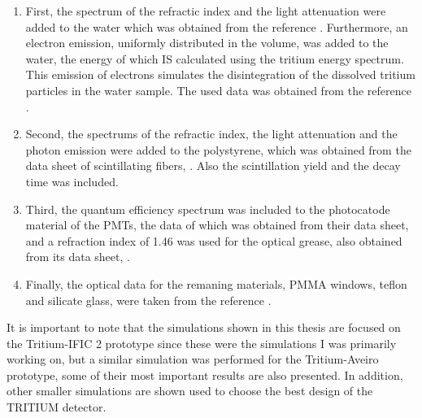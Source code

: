 \begin{enumerate}

\item{} First, the spectrum of the refractic index and the light attenuation were added to the water which was obtained from the reference \cite{WaterPropertiesSimulation}. Furthermore, an electron emission, uniformly distributed in the volume, was added to the water, the energy of which IS calculated using the tritium energy spectrum. This emission of electrons simulates the disintegration of the dissolved tritium particles in the water sample. The used data was obtained from the reference \cite{TritiumEmissionSpectrum}.

\item{} Second, the spectrums of the refractic index, the light attenuation and the photon emission were added to the polystyrene, which was obtained from the data sheet of scintillating fibers, \cite{DataSheetBCF12Fiber}.  Also the scintillation yield and the decay time was included. 

\item{} Third, the quantum efficiency spectrum was included to the photocatode material of the PMTs, the data of which was obtained from their data sheet, \cite{DataSheetPMTs} and a refraction index of 1.46 was used for the optical grease, also obtained from its data sheet, \cite{OpticalGrease}.

\item{} Finally, the optical data for the remaning materials, PMMA windows, teflon and silicate glass, were taken from the reference \cite{NEMODataSimulation}.

\end{enumerate} 

It is important to note that the simulations shown in this thesis are focused on the Tritium-IFIC 2 prototype since these were the simulations I was primarily working on, but a similar simulation was performed for the Tritium-Aveiro prototype, some of their most important results are also presented. In addition, other smaller simulations are shown used to choose the best design of the TRITIUM detector.